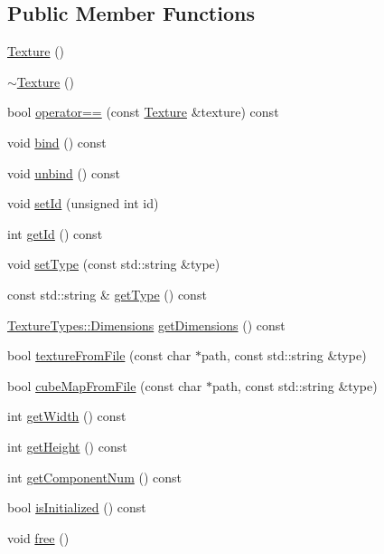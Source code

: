 \subsection*{Public Member Functions}
\begin{DoxyCompactItemize}
\item 
\mbox{\hyperlink{classec_1_1_texture_ac2551ef676d0c771f35dc470b8a0b237}{Texture}} ()
\item 
\mbox{\hyperlink{classec_1_1_texture_ae567d80654dd09c6b02a38ca8de29ead}{$\sim$\+Texture}} ()
\item 
bool \mbox{\hyperlink{classec_1_1_texture_ab00e335380881f3267732186381c777c}{operator==}} (const \mbox{\hyperlink{classec_1_1_texture}{Texture}} \&texture) const
\item 
void \mbox{\hyperlink{classec_1_1_texture_a9e2f0191cfcc85c87edb821508cc06ee}{bind}} () const
\item 
void \mbox{\hyperlink{classec_1_1_texture_a95c72abc5c801df231fc970c6adffdcc}{unbind}} () const
\item 
void \mbox{\hyperlink{classec_1_1_texture_af3555f8dda9a13babcb96d40d4417813}{set\+Id}} (unsigned int id)
\item 
int \mbox{\hyperlink{classec_1_1_texture_a0097b0b1826d7339ae109a187b6304d5}{get\+Id}} () const
\item 
void \mbox{\hyperlink{classec_1_1_texture_a4d984f43478753facd81186d1cd36bcb}{set\+Type}} (const std\+::string \&type)
\item 
const std\+::string \& \mbox{\hyperlink{classec_1_1_texture_a1c33bc610c0b5c7807fa92897320349f}{get\+Type}} () const
\item 
\mbox{\hyperlink{structec_1_1_texture_types_ac0e07f24452fa28dd8e6e33a224842fc}{Texture\+Types\+::\+Dimensions}} \mbox{\hyperlink{classec_1_1_texture_a5d1e6d8dd6c98ea036caf2696e47637a}{get\+Dimensions}} () const
\item 
bool \mbox{\hyperlink{classec_1_1_texture_ac2461a696b914d1b22192a87d326f480}{texture\+From\+File}} (const char $\ast$path, const std\+::string \&type)
\item 
bool \mbox{\hyperlink{classec_1_1_texture_ae84b0f18fa11275f09e4c8ea3dc89e02}{cube\+Map\+From\+File}} (const char $\ast$path, const std\+::string \&type)
\item 
int \mbox{\hyperlink{classec_1_1_texture_a0c01b293f7fe1b9ee863a1a2e9b64a6f}{get\+Width}} () const
\item 
int \mbox{\hyperlink{classec_1_1_texture_a45ff89dd7453c2d09ec10ba8aa58835c}{get\+Height}} () const
\item 
int \mbox{\hyperlink{classec_1_1_texture_a941dc88bd9843fcf8273dc8d8a259c03}{get\+Component\+Num}} () const
\item 
bool \mbox{\hyperlink{classec_1_1_texture_ab81c62fde2f54dfbb5895a421224fcd9}{is\+Initialized}} () const
\item 
void \mbox{\hyperlink{classec_1_1_texture_a57242daae8cc1ea827848f9b7f7b7fbb}{free}} ()
\end{DoxyCompactItemize}


